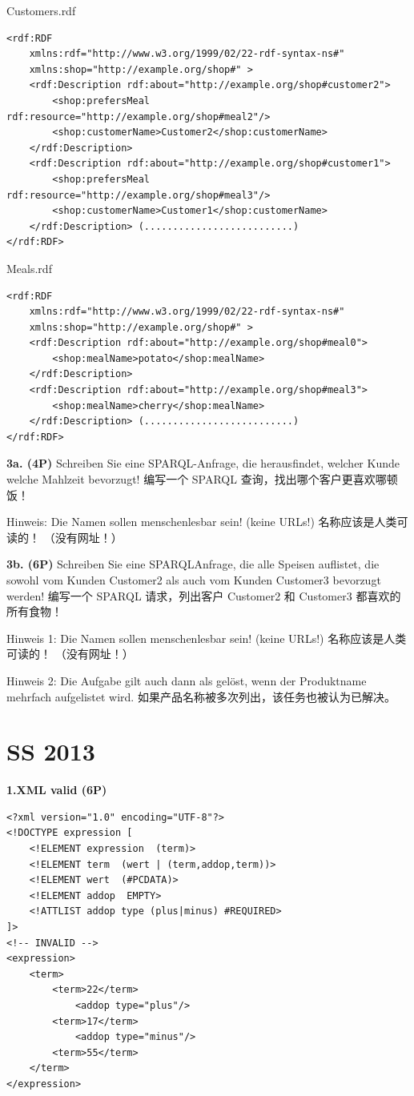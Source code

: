 \documentclass[fontset=windows]{article}
\begin{document}
Customers.rdf
\begin{verbatim}
<rdf:RDF 
	xmlns:rdf="http://www.w3.org/1999/02/22-rdf-syntax-ns#" 
	xmlns:shop="http://example.org/shop#" >
	<rdf:Description rdf:about="http://example.org/shop#customer2"> 
		<shop:prefersMeal rdf:resource="http://example.org/shop#meal2"/> 
		<shop:customerName>Customer2</shop:customerName>
	</rdf:Description> 
	<rdf:Description rdf:about="http://example.org/shop#customer1"> 
		<shop:prefersMeal rdf:resource="http://example.org/shop#meal3"/> 
		<shop:customerName>Customer1</shop:customerName>
	</rdf:Description> (..........................)
</rdf:RDF>
\end{verbatim}

Meals.rdf
\begin{verbatim}
<rdf:RDF 
	xmlns:rdf="http://www.w3.org/1999/02/22-rdf-syntax-ns#" 
	xmlns:shop="http://example.org/shop#" >
	<rdf:Description rdf:about="http://example.org/shop#meal0"> 
		<shop:mealName>potato</shop:mealName>
	</rdf:Description> 
	<rdf:Description rdf:about="http://example.org/shop#meal3"> 
		<shop:mealName>cherry</shop:mealName>
	</rdf:Description> (..........................)
</rdf:RDF>
\end{verbatim}

\textbf{3a. (4P) }Schreiben Sie eine SPARQL-­Anfrage, die herausfindet, welcher Kunde welche Mahlzeit bevorzugt!
编写一个 SPARQL 查询，找出哪个客户更喜欢哪顿饭！

Hinweis: Die Namen sollen menschenlesbar sein! (keine URLs!) 名称应该是人类可读的！ （没有网址！）

\textbf{3b. (6P) }Schreiben Sie eine SPARQL­Anfrage, die alle Speisen auflistet, die sowohl vom Kunden Customer2 als auch vom Kunden Customer3 bevorzugt werden! 
编写一个 SPARQL 请求，列出客户 Customer2 和 Customer3 都喜欢的所有食物！

Hinweis 1: Die Namen sollen menschenlesbar sein! (keine URLs!) 名称应该是人类可读的！ （没有网址！）

Hinweis 2: Die Aufgabe gilt auch dann als gelöst, wenn der Produktname mehrfach aufgelistet wird.
如果产品名称被多次列出，该任务也被认为已解决。

\section{SS 2013}

\textbf{1.XML valid (6P)}

\begin{verbatim}
<?xml version="1.0" encoding="UTF-8"?>
<!DOCTYPE expression [
  	<!ELEMENT expression  (term)>  
  	<!ELEMENT term  (wert | (term,addop,term))>  
	<!ELEMENT wert  (#PCDATA)>
  	<!ELEMENT addop  EMPTY>
  	<!ATTLIST addop type (plus|minus) #REQUIRED>
]>
<!-- INVALID -->
<expression>
  	<term>
   	 	<term>22</term>
      		<addop type="plus"/>
    	<term>17</term>
      		<addop type="minus"/>
    	<term>55</term>
  	</term>
</expression>
\end{verbatim}
\end{document}
